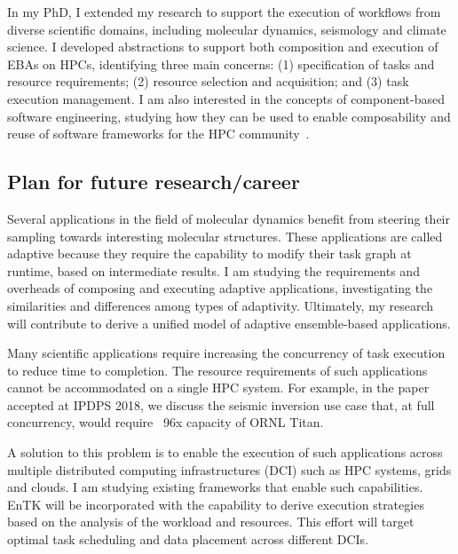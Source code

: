 In my PhD, I extended my research to support the execution of workflows from
diverse scientific domains, including molecular dynamics, seismology and
climate science. I developed abstractions to support both composition and
execution of EBAs on HPCs, identifying three main concerns: (1)
specification of tasks and resource requirements; (2) resource selection and
acquisition; and (3) task execution management. I am also interested in the
concepts of component-based software engineering, studying how they can be
used to enable composability and reuse of software frameworks
for the HPC community~\cite{review_bb_2016}.

\subsection{Plan for future research/career}

Several applications in the field of molecular dynamics benefit from steering
their sampling towards interesting molecular structures. These applications
are called adaptive because they require the capability to modify their task
graph at runtime, based on intermediate results. I am studying the requirements 
and overheads of composing and executing adaptive applications, investigating 
the similarities and differences among types of adaptivity. Ultimately, my 
research will contribute to derive a unified model of adaptive ensemble-based 
applications.

Many scientific applications require increasing the concurrency of task
execution to reduce time to completion. The resource requirements of such
applications cannot be accommodated on a single HPC system. For example, in
the paper accepted at IPDPS 2018, we discuss the seismic inversion use case
that, at full concurrency, would require ~96x capacity of ORNL Titan.

  A solution to this problem is to enable 
the execution of such applications across multiple distributed computing 
infrastructures (DCI) such as HPC systems, grids and clouds. I am studying 
existing frameworks that enable such capabilities. EnTK will be incorporated 
with the capability to derive execution strategies based on the analysis of 
the workload and resources. This effort will target optimal task scheduling 
and data placement across different DCIs.


